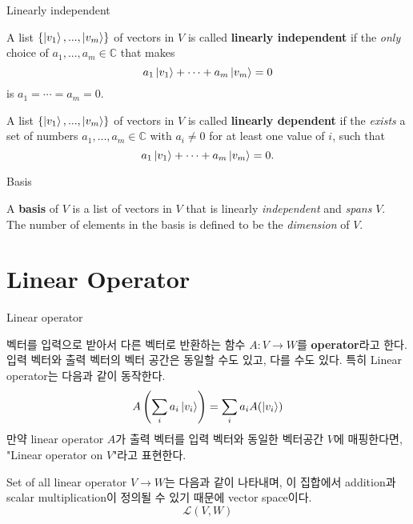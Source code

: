 \documentclass[9pt]{beamer}
\begin{document}
    \begin{frame}{Linearly independent}
        \begin{definition}
            A list $\{\ket{v_1}, ... , \ket{v_m}\}$ of vectors in $V$ is called \textbf{linearly independent} if the \textit{only} choice of $a_1, ... , a_m \in \mathbb C$ that makes  
            $$a_1\ket{v_1} + \cdots + a_m \ket{v_m} = 0$$ is $a_1 = \cdots = a_m = 0$.
        \end{definition}
        \begin{definition}
            A list $\{\ket{v_1}, ... , \ket{v_m}\}$ of vectors in $V$ is called \textbf{linearly dependent} if the \textit{exists} a set of numbers $a_1, ... , a_m \in \mathbb C$ with $a_i \ne 0$ for at least one value of $i$, such that 
            $$a_1\ket{v_1} + \cdots + a_m \ket{v_m} = 0.$$
        \end{definition}
    \end{frame}

    \begin{frame}{Basis}
        \begin{definition}
            A \textbf {basis} of $V$ is a list of vectors in $V$ that is linearly \textit{independent} and \textit{spans} $V$. \\
            The number of elements in the basis is defined to be the \textit{dimension} of $V$.
        \end{definition}
    \end{frame}


    \section{Linear Operator}
    \begin{frame}{Linear operator}
        \begin{definition}
            벡터를 입력으로 받아서 다른 벡터로 반환하는 함수 $A: V \rightarrow W$를 \textbf{operator}라고 한다. 입력 벡터와 출력 벡터의 벡터 공간은 동일할 수도 있고, 다를 수도 있다. 특히 Linear operator는 다음과 같이 동작한다.
            $$A \left( \sum_i a_i \ket{v_i} \right) = \sum_i a_i A(\ket{v_i})$$
            만약 linear operator $A$가 출력 벡터를 입력 벡터와 동일한 벡터공간 $V$에 매핑한다면, "Linear operator on $V$"라고 표현한다. 
        \end{definition}

        \begin{theorem}
            Set of all linear operator $V \rightarrow W$는 다음과 같이 나타내며, 이 집합에서 addition과 scalar multiplication이 정의될 수 있기 때문에 vector space이다. 
            $$\mathcal L(V, W)$$
        \end{theorem}
    \end{frame}
    
\end{document}
